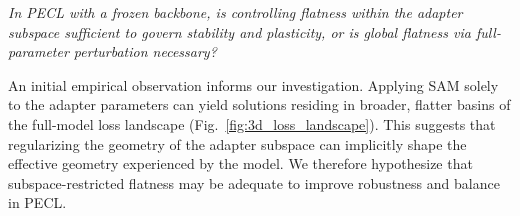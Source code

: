 \documentclass{article}
\theoremstyle{plain}
\theoremstyle{definition}
\theoremstyle{remark}
\begin{document}
\emph{In PECL with a frozen backbone, is controlling flatness within the adapter subspace sufficient to govern stability and plasticity, or is global flatness via full-parameter perturbation necessary?}




An initial empirical observation informs our investigation. Applying SAM solely to the adapter parameters can yield solutions residing in broader, flatter basins of the full-model loss landscape (Fig.~\ref{fig:3d_loss_landscape}). This suggests that regularizing the geometry of the adapter subspace can implicitly shape the effective geometry experienced by the model. We therefore hypothesize that subspace-restricted flatness may be adequate to improve robustness and balance in PECL.



\end{document}
